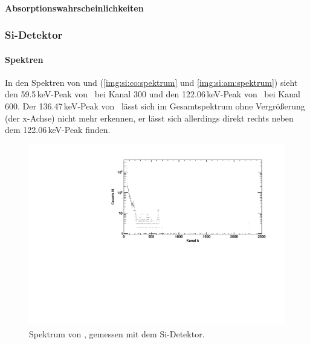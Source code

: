 \paragraph{Absorptionswahrscheinlichkeiten}

\subsubsection{Si-Detektor}
\paragraph{Spektren}
In den Spektren von \co und \am (\autoref{img:si:co:spektrum} und \autoref{img:si:am:spektrum}) sieht den 59.5\,keV-Peak 
von \am\, bei Kanal 300 und den 122.06\,keV-Peak von \co\, bei Kanal 600. Der 136.47\,keV-Peak von \co\, lässt sich im Gesamtspektrum 
ohne Vergrößerung (der x-Achse) nicht mehr erkennen, er lässt sich allerdings direkt rechts neben dem 122.06\,keV-Peak finden.
\begin{figure}[H]
\begin{center}
  \includegraphics[width=\textwidth]{../img/part3/Co-Si_spectrum.pdf}
  \caption{Spektrum von \co, gemessen mit dem Si-Detektor.}
  \label{img:si:co:spektrum}
\end{center}
\end{figure}

